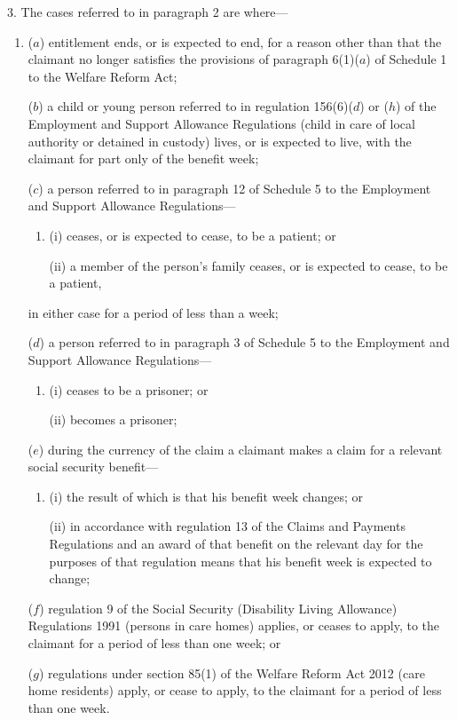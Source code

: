 \documentclass[12pt,a4paper]{article}
\begin{document}
3.  The cases referred to in paragraph 2 are where—
\begin{enumerate}\item[]
($a$) entitlement ends, or is expected to end, for a reason other than that the claimant no longer satisfies the provisions of paragraph 6(1)($a$)  of Schedule 1 to the Welfare Reform Act;

($b$) a child or young person referred to in regulation 156(6)($d$)  or ($h$)  of the Employment and Support Allowance Regulations (child in care of local authority or detained in custody) lives, or is expected to live, with the claimant for part only of the benefit week;

($c$) a person referred to in paragraph 12 of Schedule 5 to the Employment and Support Allowance Regulations—
\begin{enumerate}\item[]
(i) ceases, or is expected to cease, to be a patient; or

(ii) a member of the person’s family ceases, or is expected to cease, to be a patient,
\end{enumerate}
in either case for a period of less than a week;

($d$) a person referred to in paragraph 3 of Schedule 5 to the Employment and Support Allowance Regulations—
\begin{enumerate}\item[]
(i) ceases to be a prisoner; or

(ii) becomes a prisoner;
\end{enumerate}

($e$) during the currency of the claim a claimant makes a claim for a relevant social security benefit—
\begin{enumerate}\item[]
(i) the result of which is that his benefit week changes; or

(ii) in accordance with regulation 13 of the Claims and Payments Regulations and an award of that benefit on the relevant day for the purposes of that regulation means that his benefit week is expected to change;
\end{enumerate}

($f$) regulation 9 of the Social Security (Disability Living Allowance) Regulations 1991 (persons in care homes) applies, or ceases to apply, to the claimant for a period of less than one week; or

($g$) regulations under section 85(1) of the Welfare Reform Act 2012 (care home residents) apply, or cease to apply, to the claimant for a period of less than one week.
\end{enumerate}
\end{document}
